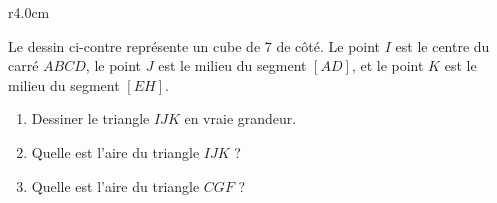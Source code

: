 
\begin{exercice}\label{exoSeconde-0095}

    \begin{wrapfigure}{r}{4.0cm}
        \vspace{-0.7cm}
        \centering
                    
                \end{wrapfigure}

        Le dessin ci-contre représente un cube de \unit{7}{\centi\meter} de côté. Le point \( I\) est le centre du carré \( ABCD\), le point \( J\) est le milieu du segment \( [AD]\), et le point \( K\) est le milieu du segment \( [EH]\).
        \begin{enumerate}
    \item
        Dessiner le triangle \( IJK\) en vraie grandeur.
            \item
        Quelle est l'aire du triangle \( IJK\) ?
    \item
    Quelle est l'aire du triangle \( CGF\) ?
        \end{enumerate}


%

\end{exercice}

